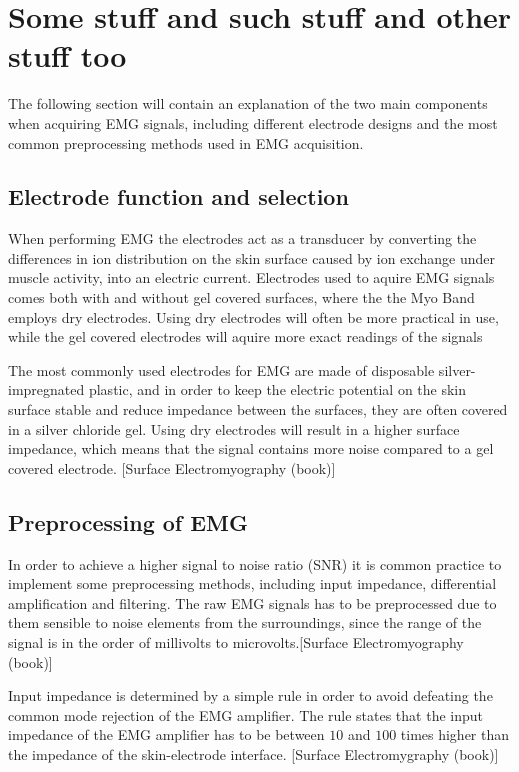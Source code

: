 \section{Some stuff and such stuff and other stuff too}

The following section will contain an explanation of the two main components when acquiring EMG signals, including different electrode designs and the most common preprocessing methods used in EMG acquisition.

\subsection{Electrode function and selection}

When performing EMG the electrodes act as a transducer by converting the differences in ion distribution on the skin surface caused by ion exchange under muscle activity, into an electric current. Electrodes used to aquire EMG signals comes both with and without gel covered surfaces, where the the Myo Band employs dry electrodes. Using dry electrodes will often be more practical in use, while the gel covered electrodes will aquire more exact readings of the signals %

The most commonly used electrodes for EMG are made of disposable silver-impregnated plastic, and in order to keep the electric potential on the skin surface stable and reduce impedance between the surfaces, they are often covered in a silver chloride gel. Using dry electrodes will result in  a higher surface impedance, which means that the signal contains more noise compared to a gel covered electrode. [Surface Electromyography (book)]

\subsection{Preprocessing of EMG}

In order to achieve a higher signal to noise ratio (SNR) it is common practice to implement some preprocessing methods, including input impedance, differential amplification and filtering. The raw EMG signals has to be preprocessed due to them sensible to noise elements from the surroundings, since the range of the signal is in the order of millivolts to microvolts.[Surface Electromyography (book)]

Input impedance is determined by a simple rule in order to avoid defeating the common mode rejection of the EMG amplifier. The rule states that the input impedance of the EMG amplifier has to be between $10$ and $100$ times higher than the impedance of the skin-electrode interface. [Surface Electromygraphy (book)]

